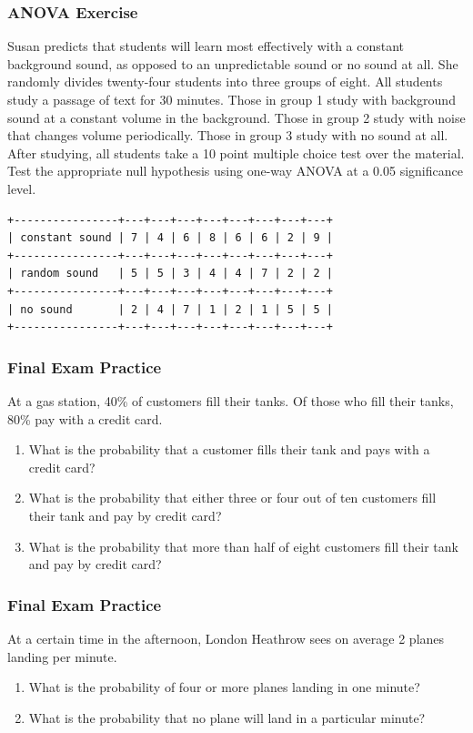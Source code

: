 \documentclass[xcolor=dvipsnames]{beamer}
\begin{document}
\begin{frame}[fragile]
  \frametitle{ANOVA Exercise}
  Susan predicts that students will learn most effectively with a
  constant background sound, as opposed to an unpredictable sound
  or no sound at all. She randomly divides twenty-four students
  into three groups of eight. All students study a passage of text
  for 30 minutes. Those in group 1 study with background sound at
  a constant volume in the background. Those in group 2 study with
  noise that changes volume periodically. Those in group 3 study
  with no sound at all. After studying, all students take a 10
  point multiple choice test over the material. Test the
  appropriate null hypothesis using one-way ANOVA at a 0.05
  significance level.

\begin{footnotesize}
\begin{verbatim}
+----------------+---+---+---+---+---+---+---+---+
| constant sound | 7 | 4 | 6 | 8 | 6 | 6 | 2 | 9 |
+----------------+---+---+---+---+---+---+---+---+
| random sound   | 5 | 5 | 3 | 4 | 4 | 7 | 2 | 2 |
+----------------+---+---+---+---+---+---+---+---+
| no sound       | 2 | 4 | 7 | 1 | 2 | 1 | 5 | 5 |
+----------------+---+---+---+---+---+---+---+---+
\end{verbatim}
\end{footnotesize}
\end{frame}

\begin{frame}
  \frametitle{Final Exam Practice}
  {\ubung} At a gas station, 40\% of customers fill their tanks. Of
  those who fill their tanks, 80\% pay with a credit card.
  \begin{enumerate}
  \item What is the probability that a customer fills their tank and
    pays with a credit card?
  \item What is the probability that either three or four out of ten
    customers fill their tank and pay by credit card?
  \item What is the probability that more than half of eight customers
    fill their tank and pay by credit card?
  \end{enumerate}
\end{frame}

\begin{frame}
  \frametitle{Final Exam Practice}
  {\ubung} At a certain time in the afternoon, London Heathrow sees on average 2
  planes landing per minute.
  \begin{enumerate}
  \item What is the probability of four or more planes landing in one
    minute?
  \item What is the probability that no plane will land in a
    particular minute?
  \end{enumerate}
\end{frame}
\end{document}
